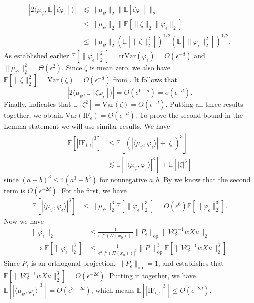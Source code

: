\documentclass[11pt]{article}
\begin{document}
\begin{align*}
    |2\langle \mu_{\psi}, \mathbb{E}[\zeta \varphi_{ \epsilon}]\rangle| & \lesssim \|\mu_\psi\|_2\|\mathbb{E}[\zeta \varphi_{\epsilon}]\|_2 \tag{Cauchy-Schwartz} \\
    &\leq\|\mu_\psi\|_2\|\mathbb{E}[\|\zeta\|_2 \|\varphi_{\epsilon}\|_2] \tag{Jensen's Inequality}\\
    &\leq \|
    \mu_{\psi}\|_2 \left(\mathbb{E}[\|\zeta\|_2^2]\right)^{1/2}\left(\mathbb{E}[\|\varphi_{\epsilon}\|_2^2]\right)^{1/2}. \tag{Cauchy-Schwartz}
\end{align*}
As established earlier $\mathbb{E}[\|\varphi_{\epsilon}\|_2^2] = \text{tr}\text{Var}(\varphi_\epsilon) = O(\epsilon^{-d})$ and $\|\mu_\psi\|_2^2 = \Theta(\epsilon^2)$. Since $\zeta$ is mean zero, we also have $\mathbb{E}[\|\zeta\|_2^2] = \text{Var}(\zeta) = O(\epsilon^{-d})$ from . It follows that 
\[|2\langle \mu_{\psi}, \mathbb{E}[\zeta \varphi_{ \epsilon}]\rangle| = O(\epsilon^{1-d}) = o(\epsilon^{-d}).\]
Finally,  indicates that $\mathbb{E}[\zeta^2] = \text{Var}(\zeta) = \Theta(\epsilon^{-d}).$ Putting all three results together, we obtain $\text{Var}(\text{IF}_{\epsilon}) = \Theta(\epsilon^{-d}).$ To prove the second bound in the Lemma statement we will use similar results. We have
\begin{align*}
    \mathbb{E}[|\text{IF}_{i, \epsilon}|^3] &\leq  \mathbb{E}\left[(|\langle \mu_{\psi}, \varphi_{\epsilon}\rangle|+ |\zeta|)^3\right] \\
    &\lesssim \mathbb{E}\left[|\langle \mu_{\psi}, \varphi_{\epsilon}\rangle|^3 \right]+ \mathbb{E}\left[|\zeta|^3\right]
\end{align*}
since $(a + b)^3 \leq 4(a^3 + b^3)$ for nonnegative $a, b$. By  we know that the second term is $O(\epsilon^{-2d})$. For the first, we have 
\begin{align*}
    \mathbb{E}\left[|\langle \mu_{\psi}, \varphi_{\epsilon}\rangle|^3 \right] &\leq \|\mu_{\psi}\|_2^3\mathbb{E}[\|\varphi_{\epsilon}\|_2^3] = O(\epsilon^6)\mathbb{E}[\|\varphi_{\epsilon}\|_2^3].
\end{align*}
Now we have
\begin{align*}
    \|\varphi_{\epsilon}\|_2 &\leq \frac{1}{\epsilon|f'(\Pi(x_0))|}\|P_{\epsilon}\|_{\text{op}} \|VQ^{-1}wXu\|_2  \\
    \implies \mathbb{E}[\|\varphi_{\epsilon}\|_2^3] &\leq \frac{1}{\epsilon^3|f'(\Pi(x_0))|^3}\|P_{\epsilon}\|_{\text{op}}^3 \mathbb{E}[\|VQ^{-1}wXu\|_2^3].
\end{align*}
Since $P_{\epsilon}$ is an orthogonal projection, $\|P_{\epsilon}\|_{\text{op}} = 1$, and  establishes that $\mathbb{E}[\|VQ^{-1}wXu\|_2^3] = O(\epsilon^{-2d})$.  Putting it together, we have $\mathbb{E}\left[|\langle \mu_{\psi}, \varphi_{\epsilon}\rangle|^3 \right] = O(\epsilon^{3-2d})$, which means $\mathbb{E}[|\text{IF}_{i, \epsilon}|^3] \leq O(\epsilon^{-2d})$. 
\end{document}
